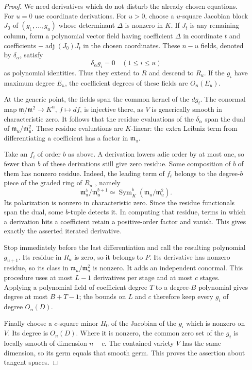 \begin{proof}
We need derivatives which do not disturb the already chosen equations.
For $u=0$ use coordinate derivations.  For $u>0$, choose a $u$-square
Jacobian block $J_0$ of $(g_1,\ldots,g_u)$ whose determinant $\Delta$
is nonzero in $K$.  If $J_t$ is any remaining column, form a polynomial
vector field having coefficient $\Delta$ in coordinate $t$ and
coefficients $-\operatorname{adj}(J_0)J_t$ in the chosen coordinates.
These $n-u$ fields, denoted by $\delta_\alpha$, satisfy
\[
 \delta_\alpha g_i=0\quad(1\leq i\leq u)
\]
as polynomial identities.  Thus they extend to $R$ and descend to
$R_u$.  If the $g_i$ have maximum degree $E_u$, the coefficient degrees
of these fields are $O_n(E_u)$.

At the generic point, the fields span the common kernel of the
$d g_i$.  The conormal map
$\mathfrak m/\mathfrak m^2\to K^n$, $f\mapsto df$, is injective there,
as $V$ is generically smooth in characteristic zero.  It follows that
the residue evaluations of the $\delta_\alpha$ span the dual of
$\mathfrak m_u/\mathfrak m_u^2$.  These residue evaluations are
$K$-linear: the extra Leibniz term from differentiating a coefficient
has a factor in $\mathfrak m_u$.

Take an $f_i$ of order $b$ as above.  A derivation lowers adic order by
at most one, so fewer than $b$ of these derivations still give zero
residue.  Some composition of $b$ of them has nonzero residue.  Indeed,
the leading term of $f_i$ belongs to the degree-$b$ piece of the graded
ring of $R_u$ \cite[Tag~00NO]{stacksproject}, namely
\[
 \mathfrak m_u^b/\mathfrak m_u^{b+1}
 \simeq\operatorname{Sym}^b_K(\mathfrak m_u/\mathfrak m_u^2).
\]
Its polarization is nonzero in characteristic zero.  Since the residue
functionals span the dual, some $b$-tuple detects it.  In computing
that residue, terms in which a derivation hits a coefficient retain a
positive-order factor and vanish.  This gives exactly the asserted
iterated derivative.

Stop immediately before the last differentiation and call the resulting
polynomial $g_{u+1}$.  Its residue in $R_u$ is zero, so it belongs to
$P$.  Its derivative has nonzero residue, so its class in
$\mathfrak m_u/\mathfrak m_u^2$ is nonzero.  It adds an independent
conormal.  This procedure uses at most $L-1$ derivatives per stage and
at most $c$ stages.  Applying a polynomial field of coefficient degree
$T$ to a degree-$B$ polynomial gives degree at most $B+T-1$; the bounds
on $L$ and $c$ therefore keep every $g_i$ of degree $O_n(D)$.

Finally choose a $c$-square minor $H_0$ of the Jacobian of the $g_i$
which is nonzero on $V$.  Its degree is $O_n(D)$.  Where it is nonzero,
the common zero set of the $g_i$ is locally smooth of dimension $n-c$.
The contained variety $V$ has the same dimension, so its germ equals
that smooth germ.  This proves the assertion about tangent spaces.
\end{proof}


